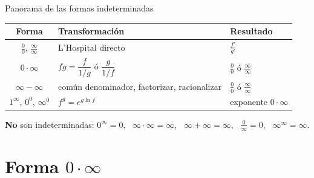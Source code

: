 \documentclass[10pt,aspectratio=169]{beamer}
\begin{document}
\begin{frame}{Panorama de las formas indeterminadas}
  \renewcommand{\arraystretch}{1.5}
  \begin{center}
    \begin{tabular}{c|l|l}
      \textbf{Forma} & \textbf{Transformación} & \textbf{Resultado}\\ \hline
      $\frac00$, $\frac\infty\infty$ & L'Hospital directo & $\frac{f'}{g'}$\\
      $0\cdot\infty$ & $fg=\dfrac{f}{1/g}$ ó $\dfrac{g}{1/f}$ & $\frac00$ ó $\frac\infty\infty$\\
      $\infty-\infty$ & común denominador, factorizar, racionalizar & $\frac00$ ó $\frac\infty\infty$\\
      $1^\infty$, $0^0$, $\infty^0$ & $f^g=e^{g\ln f}$ & exponente $0\cdot\infty$
    \end{tabular}
  \end{center}
  \begin{observacion}
    \textbf{No} son indeterminadas: $0^\infty=0$, \ $\infty\cdot\infty=\infty$, \ $\infty+\infty=\infty$, \ $\frac{0}{\infty}=0$, \ $\infty^\infty=\infty$.
  \end{observacion}
\end{frame}

\section{Forma $0\cdot\infty$}
\end{document}
